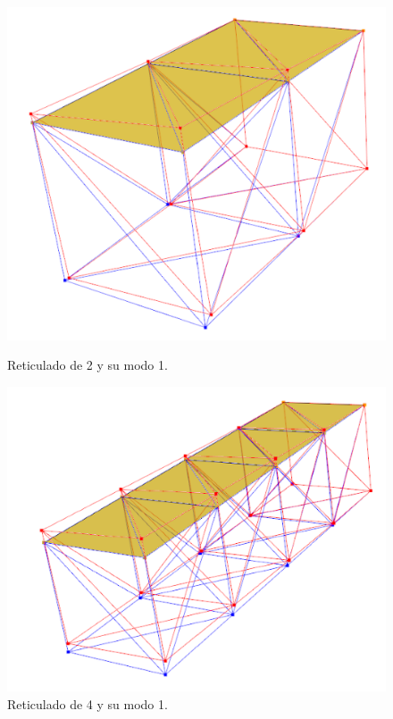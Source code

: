 \begin{figure}[H]
    \begin{minipage}[b]{0.5\textwidth}
        \centering
        \includegraphics[width=\textwidth]{FOTOS/m1_2.png}
        \caption{Reticulado de 2 y su modo 1.}
    \end{minipage}
    \hfill
    \begin{minipage}[b]{0.5\textwidth}
        \centering
        \includegraphics[width=\textwidth]{FOTOS/m1_4.png}
        \caption{Reticulado de 4 y su modo 1.}
    \end{minipage}
\end{figure}

